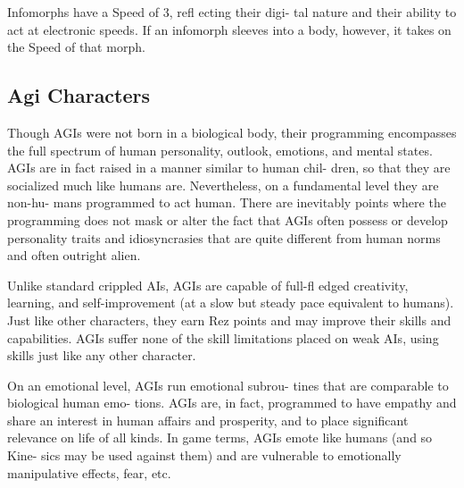 Infomorphs have a Speed of 3, refl ecting their digi-
tal nature and their ability to act at electronic speeds. 
If an infomorph sleeves into a body, however, it takes 
on the Speed of that morph.

\subsection{Agi Characters}

Though AGIs were not born in a biological body, their 
programming encompasses the full spectrum of human 
personality, outlook, emotions, and mental states. AGIs 
are in fact raised in a manner similar to human chil-
dren, so that they are socialized much like humans are. 
Nevertheless, on a fundamental level they are non-hu-
mans programmed to act human. There are inevitably 
points where the programming does not mask or alter 
the fact that AGIs often possess or develop personality 
traits and idiosyncrasies that are quite different from 
human norms and often outright alien.

Unlike standard crippled AIs, AGIs are capable of 
full-fl edged creativity, learning, and self-improvement 
(at a slow but steady pace equivalent to humans). Just 
like other characters, they earn Rez points and may 
improve their skills and capabilities. AGIs suffer none 
of the skill limitations placed on weak AIs, using skills 
just like any other character.

On an emotional level, AGIs run emotional subrou-
tines that are comparable to biological human emo-
tions. AGIs are, in fact, programmed to have empathy 
and share an interest in human affairs and prosperity, 
and to place significant relevance on life of all kinds. 
In game terms, AGIs emote like humans (and so Kine-
sics may be used against them) and are vulnerable to 
emotionally manipulative effects, fear, etc.
